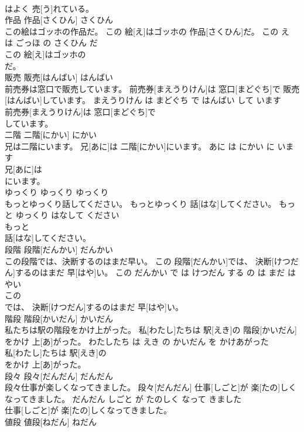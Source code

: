 \documentclass[8pt]{extreport}
\begin{document}
\begin{CJK}{UTF8}{min}
\\	はよく 売[う]れている。		
\\	作品	作品[さくひん]	さくひん	
\\	この絵はゴッホの作品だ。	この 絵[え]はゴッホの 作品[さくひん]だ。	この え は ごっほ の さくひん だ	
\\	この 絵[え]はゴッホの
\\	だ。		
\\	販売	販売[はんばい]	はんばい	
\\	前売券は窓口で販売しています。	前売券[まえうりけん]は 窓口[まどぐち]で 販売[はんばい]しています。	まえうりけん は まどぐち で はんばい して います	
\\	前売券[まえうりけん]は 窓口[まどぐち]で
\\	しています。		
\\	二階	二階[にかい]	にかい	
\\	兄は二階にいます。	兄[あに]は 二階[にかい]にいます。	あに は にかい に います	
\\	兄[あに]は
\\	にいます。		
\\	ゆっくり	ゆっくり	ゆっくり	
\\	もっとゆっくり話してください。	もっとゆっくり 話[はな]してください。	もっと ゆっくり はなして ください	
\\	もっと
\\	話[はな]してください。		
\\	段階	段階[だんかい]	だんかい	
\\	この段階では、決断するのはまだ早い。	この 段階[だんかい]では、 決断[けつだん]するのはまだ 早[はや]い。	この だんかい で は けつだん する の は まだ はやい	
\\	この
\\	では、 決断[けつだん]するのはまだ 早[はや]い。		
\\	階段	階段[かいだん]	かいだん	
\\	私たちは駅の階段をかけ上がった。	私[わたし]たちは 駅[えき]の 階段[かいだん]をかけ 上[あ]がった。	わたしたち は えき の かいだん を かけあがった	
\\	私[わたし]たちは 駅[えき]の
\\	をかけ 上[あ]がった。		
\\	段々	段々[だんだん]	だんだん	
\\	段々仕事が楽しくなってきました。	段々[だんだん] 仕事[しごと]が 楽[たの]しくなってきました。	だんだん しごと が たのしく なって きました	
\\	仕事[しごと]が 楽[たの]しくなってきました。		
\\	値段	値段[ねだん]	ねだん	

\end{CJK}
\end{document}
